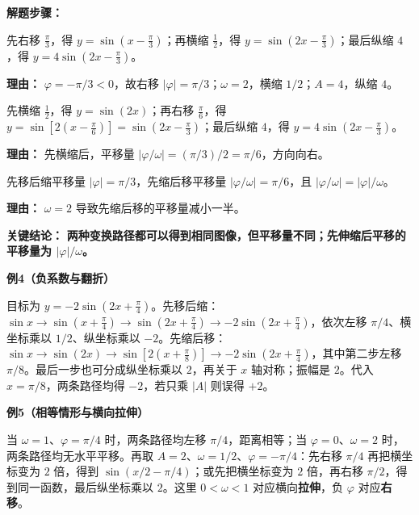 \begin{examplebox}
	\textbf{\textcolor{CExample}{解题步骤：}}
	\begin{description}[style=nextline, leftmargin=2.8em, labelsep=0.5em, itemsep=0.45em]
		\item[\textbf{第一步（先移后缩）：}] 先右移 $\frac{\pi}{3}$，得 $y=\sin(x-\frac{\pi}{3})$；再横缩 $\frac{1}{2}$，得 $y=\sin(2x-\frac{\pi}{3})$；最后纵缩 $4$，得 $y=4\sin(2x-\frac{\pi}{3})$。
			\par\textbf{理由：}
			$\varphi=-\pi/3<0$，故右移 $|\varphi|=\pi/3$；$\omega=2$，横缩 $1/2$；$A=4$，纵缩 $4$。
		\item[\textbf{第二步（先缩后移）：}] 先横缩 $\frac{1}{2}$，得 $y=\sin(2x)$；再右移 $\frac{\pi}{6}$，得 $y=\sin[2(x-\frac{\pi}{6})]=\sin(2x-\frac{\pi}{3})$；最后纵缩 $4$，得 $y=4\sin(2x-\frac{\pi}{3})$。
			\par\textbf{理由：}
			先横缩后，平移量 $|\varphi/\omega| = (\pi/3)/2 = \pi/6$，方向向右。
		\item[\textbf{第三步（平移量对比）：}] 先移后缩平移量 $|\varphi|=\pi/3$，先缩后移平移量 $|\varphi/\omega|=\pi/6$，且 $|\varphi/\omega| = |\varphi|/\omega$。
			\par\textbf{理由：}
			$\omega=2$ 导致先缩后移的平移量减小一半。
	\end{description}

	\textbf{\textcolor{CExample}{关键结论：}}
	\textbf{两种变换路径都可以得到相同图像，但平移量不同；先伸缩后平移的平移量为 $|\varphi|/\omega$。}

	\medskip
	\textbf{\textcolor{CExample}{例4（负系数与翻折）}}

	目标为 $y=-2\sin(2x+\frac{\pi}{4})$。先移后缩：$\sin x\to\sin(x+\frac{\pi}{4})\to\sin(2x+\frac{\pi}{4})\to-2\sin(2x+\frac{\pi}{4})$，依次左移 $\pi/4$、横坐标乘以 $1/2$、纵坐标乘以 $-2$。先缩后移：$\sin x\to\sin(2x)\to\sin[2(x+\frac{\pi}{8})]\to-2\sin(2x+\frac{\pi}{4})$，其中第二步左移 $\pi/8$。最后一步也可分成纵坐标乘以 $2$，再关于 $x$ 轴对称；振幅是 $2$。代入 $x=\pi/8$，两条路径均得 $-2$，若只乘 $|A|$ 则误得 $+2$。

	\medskip
	\textbf{\textcolor{CExample}{例5（相等情形与横向拉伸）}}

	当 $\omega=1$、$\varphi=\pi/4$ 时，两条路径均左移 $\pi/4$，距离相等；当 $\varphi=0$、$\omega=2$ 时，两条路径均无水平平移。再取 $A=2$、$\omega=1/2$、$\varphi=-\pi/4$：先右移 $\pi/4$ 再把横坐标变为 $2$ 倍，得到 $\sin(x/2-\pi/4)$；或先把横坐标变为 $2$ 倍，再右移 $\pi/2$，得到同一函数，最后纵坐标乘以 $2$。这里 $0<\omega<1$ 对应横向\textbf{拉伸}，负 $\varphi$ 对应\textbf{右移}。
\end{examplebox}
